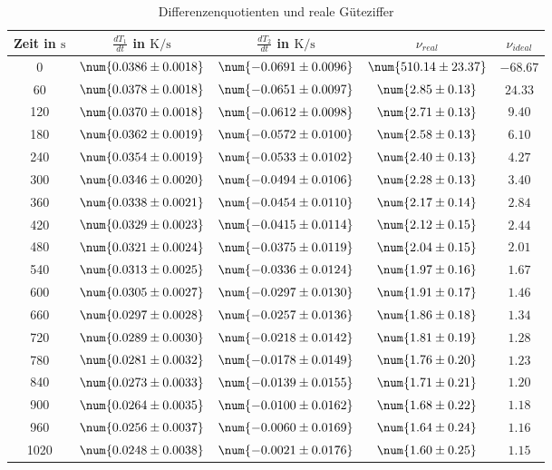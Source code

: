 \begin{table} 
 \centering 
 \begin{tabular}{S S S S S } 
 \toprule  
{Zeit in $\si{\second}$} & {$\frac{dT_1}{dt}$ in $\si{\kelvin \per \second}$} & {$\frac{dT_2}{dt}$ in $\si{\kelvin \per \second}$} & {$\nu_{real}$}& {$\nu_{ideal}$} \\ 
 & $\num{ 0.0386 \pm 0.0018 }$ & $\num{ -0.0691 \pm 0.0096 }$ & $\num{ 510.14 \pm 23.37 }$ & $\num{ -68.67 }$\\ 
60 & $\num{ 0.0378 \pm 0.0018 }$ & $\num{ -0.0651 \pm 0.0097 }$ & $\num{ 2.85 \pm 0.13 }$ & $\num{ 24.33 }$\\ 
120 & $\num{ 0.0370 \pm 0.0018 }$ & $\num{ -0.0612 \pm 0.0098 }$ & $\num{ 2.71 \pm 0.13 }$ & $\num{ 9.40 }$\\ 
180 & $\num{ 0.0362 \pm 0.0019 }$ & $\num{ -0.0572 \pm 0.0100 }$ & $\num{ 2.58 \pm 0.13 }$ & $\num{ 6.10 }$\\ 
240 & $\num{ 0.0354 \pm 0.0019 }$ & $\num{ -0.0533 \pm 0.0102 }$ & $\num{ 2.40 \pm 0.13 }$ & $\num{ 4.27 }$\\ 
300 & $\num{ 0.0346 \pm 0.0020 }$ & $\num{ -0.0494 \pm 0.0106 }$ & $\num{ 2.28 \pm 0.13 }$ & $\num{ 3.40 }$\\ 
360 & $\num{ 0.0338 \pm 0.0021 }$ & $\num{ -0.0454 \pm 0.0110 }$ & $\num{ 2.17 \pm 0.14 }$ & $\num{ 2.84 }$\\ 
420 & $\num{ 0.0329 \pm 0.0023 }$ & $\num{ -0.0415 \pm 0.0114 }$ & $\num{ 2.12 \pm 0.15 }$ & $\num{ 2.44 }$\\ 
480 & $\num{ 0.0321 \pm 0.0024 }$ & $\num{ -0.0375 \pm 0.0119 }$ & $\num{ 2.04 \pm 0.15 }$ & $\num{ 2.01 }$\\ 
540 & $\num{ 0.0313 \pm 0.0025 }$ & $\num{ -0.0336 \pm 0.0124 }$ & $\num{ 1.97 \pm 0.16 }$ & $\num{ 1.67 }$\\ 
600 & $\num{ 0.0305 \pm 0.0027 }$ & $\num{ -0.0297 \pm 0.0130 }$ & $\num{ 1.91 \pm 0.17 }$ & $\num{ 1.46 }$\\ 
660 & $\num{ 0.0297 \pm 0.0028 }$ & $\num{ -0.0257 \pm 0.0136 }$ & $\num{ 1.86 \pm 0.18 }$ & $\num{ 1.34 }$\\ 
720 & $\num{ 0.0289 \pm 0.0030 }$ & $\num{ -0.0218 \pm 0.0142 }$ & $\num{ 1.81 \pm 0.19 }$ & $\num{ 1.28 }$\\ 
780 & $\num{ 0.0281 \pm 0.0032 }$ & $\num{ -0.0178 \pm 0.0149 }$ & $\num{ 1.76 \pm 0.20 }$ & $\num{ 1.23 }$\\ 
840 & $\num{ 0.0273 \pm 0.0033 }$ & $\num{ -0.0139 \pm 0.0155 }$ & $\num{ 1.71 \pm 0.21 }$ & $\num{ 1.20 }$\\ 
900 & $\num{ 0.0264 \pm 0.0035 }$ & $\num{ -0.0100 \pm 0.0162 }$ & $\num{ 1.68 \pm 0.22 }$ & $\num{ 1.18 }$\\ 
960 & $\num{ 0.0256 \pm 0.0037 }$ & $\num{ -0.0060 \pm 0.0169 }$ & $\num{ 1.64 \pm 0.24 }$ & $\num{ 1.16 }$\\ 
1020 & $\num{ 0.0248 \pm 0.0038 }$ & $\num{ -0.0021 \pm 0.0176 }$ & $\num{ 1.60 \pm 0.25 }$ & $\num{ 1.15 }$\\ 
\bottomrule 
 \end{tabular} 
 \caption{Differenzenquotienten und reale Güteziffer} 
 \label{tab: dTdt} 
  \end{table}